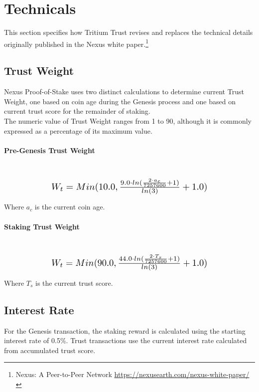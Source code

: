\documentclass[11pt]{article}
\begin{document}
\bigskip

\section{Technicals}
This section specifies how Tritium Trust revises and replaces the technical details originally published in the Nexus white paper.\footnote{Nexus: A Peer-to-Peer Network \url{https://nexusearth.com/nexus-white-paper/}}

\subsection{Trust Weight}
\noindent Nexus Proof-of-Stake uses two distinct calculations to determine current Trust Weight, one based on coin age during the Genesis process and one based on current trust score for the remainder of staking.\\

\noindent The numeric value of Trust Weight ranges from 1 to 90, although it is commonly expressed as a percentage of its maximum value.\\

\paragraph{Pre-Genesis Trust Weight} ~\\
\begin{equation}
\resizebox{.65\hsize}{!}{$W_{t} = Min(10.0, \frac{9.0 \cdot ln(\frac{2 \cdot a_c}{7257600} + 1)}{ln(3)} + 1.0)$}
\end{equation}

\noindent Where $a_c$ is the current coin age.\\

\paragraph{Staking Trust Weight} ~\\
\begin{equation}
\resizebox{.65\hsize}{!}{$W_{t} = Min(90.0, \frac{44.0 \cdot ln(\frac{2 \cdot T_{s}}{7257600} + 1)}{ln(3)} + 1.0)$}
\end{equation}

\noindent Where $T_{s}$ is the current trust score.\\


\subsection{Interest Rate}
\noindent For the Genesis transaction, the staking reward is calculated using the starting interest rate of 0.5\%. Trust transactions use the current interest rate calculated from accumulated trust score.\\
 
\end{document}
